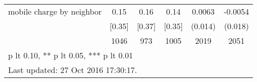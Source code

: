 \begin{table}[htbp]
\begin{tabular*}{0.9\hsize}{@{\hskip\tabcolsep\extracolsep\fill}l*{1}{ccccc}}
mobile charge by neighbor       &     0.15&     0.16&     0.14&   0.0063         &  -0.0054         \\
                                &   [0.35]&   [0.37]&   [0.35]&  (0.014)         &  (0.018)         \\
                                &     1046&      973&     1005&     2019         &     2051         \\
\bottomrule
\multicolumn{6}{l}{\footnotesize * p lt 0.10, ** p lt 0.05, *** p lt 0.01}\\
\multicolumn{6}{l}{\footnotesize Last updated: 27 Oct 2016 17:30:17.}\\
\end{tabular*}
\end{table}
